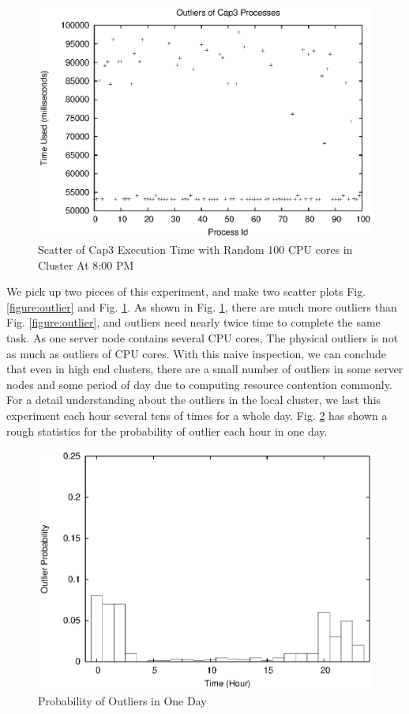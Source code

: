 \begin{figure}
\centering
\includegraphics[width=0.9\columnwidth]{figures/yaoutliers.eps}
\caption{Scatter of Cap3 Execution Time with Random 100 CPU cores in Cluster At 8:00 PM}
\label{figure:yaoutlier}
\end{figure}

We pick up two pieces of this experiment, and make two scatter plots Fig. \ref{figure:outlier} and Fig. \ref{figure:yaoutlier}. As shown in Fig. \ref{figure:yaoutlier}, there are much more outliers than Fig. \ref{figure:outlier}, and outliers need nearly twice time to complete the same task. As one server node contains several CPU cores, The physical outliers is not as much as outliers of CPU cores. With this naive inspection, we can conclude that even in high end clusters, there are a small number of outliers in some server nodes and some period of day due to computing resource contention commonly. For a detail understanding about the outliers in the local cluster, we last this experiment each hour several tens of times for a whole day. Fig. \ref{figure:outlier_stats} has shown a rough statistics for the probability of outlier each hour in one day.

\begin{figure}
\centering
\includegraphics[width=0.9\columnwidth]{figures/outlier_stats.eps}
\caption{Probability of Outliers in One Day}
\label{figure:outlier_stats}
\end{figure}

